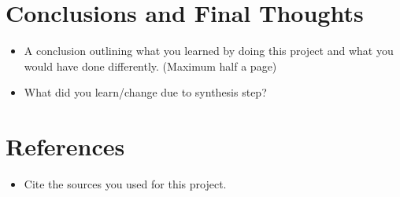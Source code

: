 \documentclass[11pt]{article}
\begin{document}
\section{Conclusions and Final Thoughts}
\begin{itemize}
\item[---] A conclusion outlining what you learned by doing this project and what you would have done differently.
(Maximum half a page)
\item[---] What did you learn/change due to synthesis step?
\end{itemize}

\section{References}
\begin{itemize}
\item[---] Cite the sources you used for this project.
\end{itemize}
\end{document}
